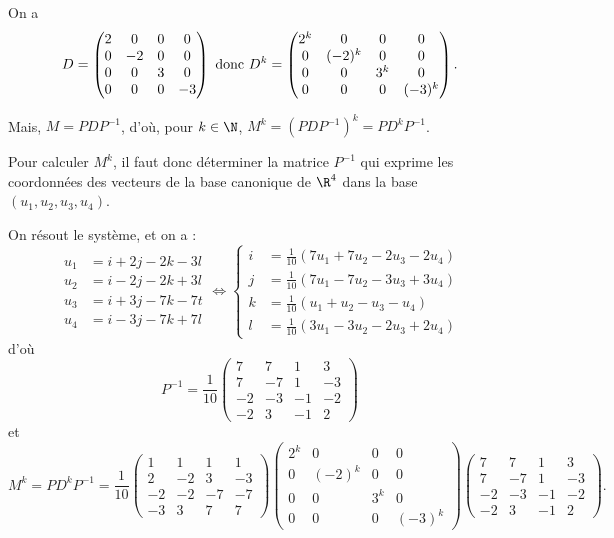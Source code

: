 {\begin{enumerate}
{On a $$D=\begin{pmatrix}2&0&0&0 \\  0&-2&0&0 \\  0&0&3&0 \\  0&0&0&-3\end{pmatrix}\ {\hbox{donc}}\ 
D^k=\begin{pmatrix}2^k&0&0&0 \\  0&(-2)^k&0&0 \\  0&0&3^k&0 \\  0&0&0&(-3)^k\end{pmatrix}.$$

Mais, $M=PDP^{-1}$, d'o\`u, pour $k\in\N$, $M^k=(PDP^{-1})^k=PD^kP^{-1}$. 

Pour calculer $M^k$, il faut donc d\'eterminer la matrice $P^{-1}$ qui exprime les coordonn\'ees des vecteurs de la base canonique de $\R^4$ dans la base $(u_1,u_2,u_3,u_4)$.

On r\'esout le syst\`eme, et on a :
$$\begin{align*}u_1&=i+2j-2k-3l \\  u_2&=i-2j-2k+3l \\  u_3&=i+3j-7k-7t \\  u_4&=i-3j-7k+7l\end{align*}\iff
\left\{\begin{align*}i&={\frac{1}{10}}(7u_1+7u_2-2u_3-2u_4) \\  
j&={\frac{1}{10}}(7u_1-7u_2-3u_3+3u_4) \\  
k&={\frac{1}{10}}(u_1+u_2-u_3-u_4) \\  
l&={\frac{1}{10}}(3u_1-3u_2-2u_3+2u_4)\end{align*}\right.$$
d'o\`u
$$P^{-1}={\frac{1}{10}}\begin{pmatrix}7&7&1&3 \\  7&-7&1&-3 \\  -2&-3&-1&-2 \\  -2&3&-1&2\end{pmatrix}$$
et 
$$M^k=PD^kP^{-1}={\frac{1}{10}}\begin{pmatrix}1&1&1&1 \\  2&-2&3&-3 \\  -2&-2&-7&-7 \\  -3&3&7&7\end{pmatrix}
\begin{pmatrix}2^k&0&0&0 \\  0&(-2)^k&0&0 \\  0&0&3^k&0 \\  0&0&0&(-3)^k\end{pmatrix}
\begin{pmatrix}7&7&1&3 \\  7&-7&1&-3 \\  -2&-3&-1&-2 \\  -2&3&-1&2\end{pmatrix}.$$}
\end{enumerate}
}
